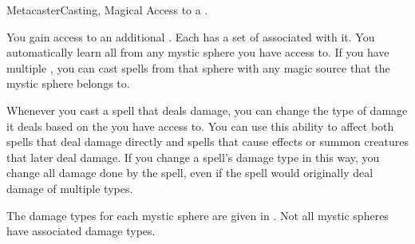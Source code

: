     \begin{feat}{Metacaster}{Casting, Magical}
        \featpre Access to a .

         You gain access to an additional .
        Each  has a set of  associated with it.
        You automatically learn all  from any mystic sphere you have access to.
        If you have multiple , you can cast spells from that sphere with any magic source that the mystic sphere belongs to.

         Whenever you cast a spell that deals damage, you can change the type of damage it deals based on the  you have access to.
        You can use this ability to affect both spells that deal damage directly and spells that cause effects or summon creatures that later deal damage.
        If you change a spell's damage type in this way, you change all damage done by the spell, even if the spell would originally deal damage of multiple types.

        The damage types for each mystic sphere are given in .
        Not all mystic spheres have associated damage types.


\end{feat}
